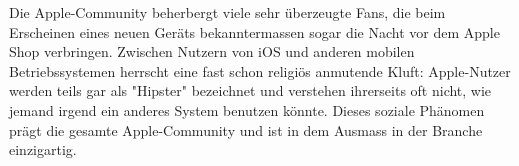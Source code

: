Die Apple-Community beherbergt viele sehr überzeugte Fans, die beim Erscheinen eines neuen Geräts bekanntermassen sogar die Nacht vor dem Apple Shop verbringen. Zwischen Nutzern von iOS und anderen mobilen Betriebssystemen herrscht eine fast schon religiös anmutende Kluft: Apple-Nutzer werden teils gar als "Hipster"\thinspace\cite{online:ios-hipster} bezeichnet und verstehen ihrerseits oft nicht, wie jemand irgend ein anderes System benutzen könnte. Dieses soziale Phänomen prägt die gesamte Apple-Community und ist in dem Ausmass in der Branche einzigartig.